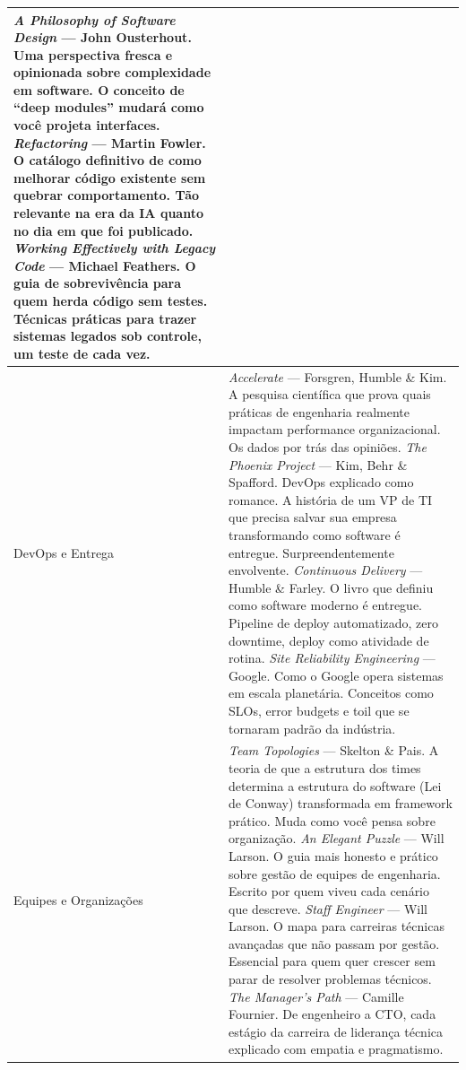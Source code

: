 \begin{table}[h]
\begin{tabular}{p{3.5cm} p{8cm}}
    \textit{A Philosophy of Software Design} --- John Ousterhout.
    Uma perspectiva fresca e opinionada sobre complexidade em software. O conceito de ``deep modules'' mudará como você projeta interfaces. \newline
    \textit{Refactoring} --- Martin Fowler.
    O catálogo definitivo de como melhorar código existente sem quebrar comportamento. Tão relevante na era da IA quanto no dia em que foi publicado. \newline
    \textit{Working Effectively with Legacy Code} --- Michael Feathers.
    O guia de sobrevivência para quem herda código sem testes. Técnicas práticas para trazer sistemas legados sob controle, um teste de cada vez. \\
\midrule
DevOps e Entrega &
    \textit{Accelerate} --- Forsgren, Humble \& Kim.
    A pesquisa científica que prova quais práticas de engenharia realmente impactam performance organizacional. Os dados por trás das opiniões. \newline
    \textit{The Phoenix Project} --- Kim, Behr \& Spafford.
    DevOps explicado como romance. A história de um VP de TI que precisa salvar sua empresa transformando como software é entregue. Surpreendentemente envolvente. \newline
    \textit{Continuous Delivery} --- Humble \& Farley.
    O livro que definiu como software moderno é entregue. Pipeline de deploy automatizado, zero downtime, deploy como atividade de rotina. \newline
    \textit{Site Reliability Engineering} --- Google.
    Como o Google opera sistemas em escala planetária. Conceitos como SLOs, error budgets e toil que se tornaram padrão da indústria. \\
\midrule
Equipes e Organizações &
    \textit{Team Topologies} --- Skelton \& Pais.
    A teoria de que a estrutura dos times determina a estrutura do software (Lei de Conway) transformada em framework prático. Muda como você pensa sobre organização. \newline
    \textit{An Elegant Puzzle} --- Will Larson.
    O guia mais honesto e prático sobre gestão de equipes de engenharia. Escrito por quem viveu cada cenário que descreve. \newline
    \textit{Staff Engineer} --- Will Larson.
    O mapa para carreiras técnicas avançadas que não passam por gestão. Essencial para quem quer crescer sem parar de resolver problemas técnicos. \newline
    \textit{The Manager's Path} --- Camille Fournier.
    De engenheiro a CTO, cada estágio da carreira de liderança técnica explicado com empatia e pragmatismo. \\

\end{tabular}
\end{table}
